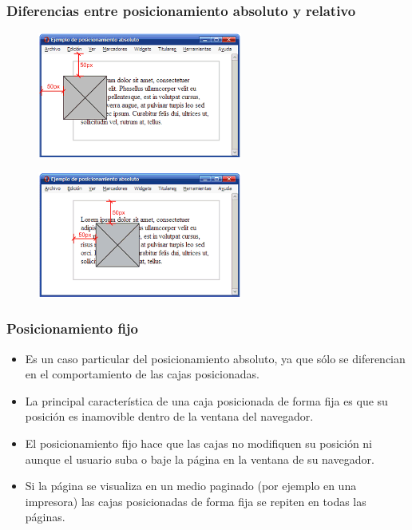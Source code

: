\documentclass[ucs]{beamer}
\begin{document}
\begin{frame}
\frametitle{Diferencias entre posicionamiento absoluto y relativo}

\begin{center}
\begin{figure}[p]
\includegraphics[width=0.6\textwidth]{figs/f0519.png}
\end{figure}
\end{center}

\begin{center}
\begin{figure}[p]
\includegraphics[width=0.6\textwidth]{figs/f0521.png}
\end{figure}
\end{center}

\end{frame}



\begin{frame}
\frametitle{Posicionamiento fijo}

\begin{itemize}
  \item Es un caso particular del posicionamiento absoluto, ya que sólo se diferencian en el comportamiento de las cajas posicionadas.
  \item La principal característica de una caja posicionada de forma fija es que su posición es inamovible dentro de la ventana del navegador.
  \item El posicionamiento fijo hace que las cajas no modifiquen su posición ni aunque el usuario suba o baje la página en la ventana de su navegador.
  \item Si la página se visualiza en un medio paginado (por ejemplo en una impresora) las cajas posicionadas de forma fija se repiten en todas las páginas.
\end{itemize}

\end{frame}
\end{document}
